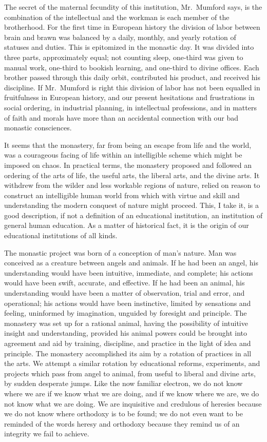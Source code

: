 \documentclass{memoir}
\begin{document}
The secret of the maternal fecundity of this institution, Mr.\ Mumford
says, is the combination of the intellectual and the workman is each
member of the brotherhood. For the first time in European history the
division of labor between brain and brawn was balanced by a daily,
monthly, and yearly rotation of statuses and duties. This is epitomized
in the monastic day. It was divided into three parts, approximately
equal; not counting sleep, one-third was given to manual work, one-third
to bookish learning, and one-third to divine offices. Each brother
passed through this daily orbit, contributed his product, and received
his discipline. If Mr.\ Mumford is right this division of labor has
not been equalled in fruitfulness in European history, and our present
hesitations and frustrations in social ordering, in industrial planning,
in intellectual professions, and in matters of faith and morals have more
than an accidental connection with our bad monastic consciences.

It seems that the monastery, far from being an escape from life and the
world, was a courageous facing of life within an intelligible scheme
which might be imposed on chaos. In practical terms, the monastery
proposed and followed an ordering of the arts of life, the useful arts,
the liberal arts, and the divine arts. It withdrew from the wilder
and less workable regions of nature, relied on reason to construct
an intelligible human world from which with virtue and skill and
understanding the modern conquest of nature might proceed. This, I
take it, is a good description, if not a definition of an educational
institution, an institution of general human education. As a matter of
historical fact, it is the origin of our educational institutions of all
kinds.

The monastic project was born of a conception of man's nature. Man was
conceived as a creature between angels and animals. If he had been an
angel, his understanding would have been intuitive, immediate, and
complete; his actions would have been swift, accurate, and effective. If
he had been an animal, his understanding would have been a matter of
observation, trial and error, and operational; his actions would have
been instinctive, limited by sensations and feeling, uninformed by
imagination, unguided by foresight and principle. The monastery was set
up for a rational animal, having the possibility of intuitive insight
and understanding, provided his animal powers could be brought into
agreement and aid by training, discipline, and practice in the light of
idea and principle. The monastery accomplished its aim by a rotation of
practices in all the arts. We attempt a similar rotation by educational
reforms, experiments, and projects which pass from angel to animal, from
useful to liberal and divine arts, by sudden desperate jumps. Like the
now familiar electron, we do not know where we are if we know what we
are doing, and if we know where we are, we do not know what we are
doing. We are inquisitive and credulous of heresies because we do not
know where orthodoxy is to be found; we do not even want to be reminded
of the words heresy and orthodoxy because they remind us of an integrity
we fail to achieve.
\end{document}
